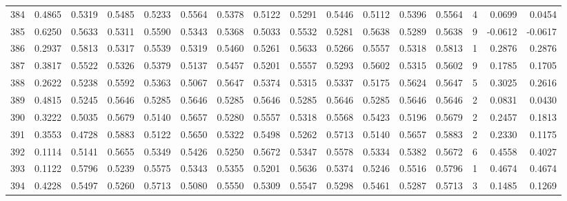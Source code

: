 \begin{tabular}{lrrrrrrrrrrrrrrr}
384 &      0.4865 &  0.5319 &  0.5485 &  0.5233 &  0.5564 &  0.5378 &  0.5122 &  0.5291 &  0.5446 &  0.5112 &   0.5396 &     0.5564 &      4 &                    0.0699 &                     0.0454 \\
385 &      0.6250 &  0.5633 &  0.5311 &  0.5590 &  0.5343 &  0.5368 &  0.5033 &  0.5532 &  0.5281 &  0.5638 &   0.5289 &     0.5638 &      9 &                   -0.0612 &                    -0.0617 \\
386 &      0.2937 &  0.5813 &  0.5317 &  0.5539 &  0.5319 &  0.5460 &  0.5261 &  0.5633 &  0.5266 &  0.5557 &   0.5318 &     0.5813 &      1 &                    0.2876 &                     0.2876 \\
387 &      0.3817 &  0.5522 &  0.5326 &  0.5379 &  0.5137 &  0.5457 &  0.5201 &  0.5557 &  0.5293 &  0.5602 &   0.5315 &     0.5602 &      9 &                    0.1785 &                     0.1705 \\
388 &      0.2622 &  0.5238 &  0.5592 &  0.5363 &  0.5067 &  0.5647 &  0.5374 &  0.5315 &  0.5337 &  0.5175 &   0.5624 &     0.5647 &      5 &                    0.3025 &                     0.2616 \\
389 &      0.4815 &  0.5245 &  0.5646 &  0.5285 &  0.5646 &  0.5285 &  0.5646 &  0.5285 &  0.5646 &  0.5285 &   0.5646 &     0.5646 &      2 &                    0.0831 &                     0.0430 \\
390 &      0.3222 &  0.5035 &  0.5679 &  0.5140 &  0.5657 &  0.5280 &  0.5557 &  0.5318 &  0.5568 &  0.5423 &   0.5196 &     0.5679 &      2 &                    0.2457 &                     0.1813 \\
391 &      0.3553 &  0.4728 &  0.5883 &  0.5122 &  0.5650 &  0.5322 &  0.5498 &  0.5262 &  0.5713 &  0.5140 &   0.5657 &     0.5883 &      2 &                    0.2330 &                     0.1175 \\
392 &      0.1114 &  0.5141 &  0.5655 &  0.5349 &  0.5426 &  0.5250 &  0.5672 &  0.5347 &  0.5578 &  0.5334 &   0.5382 &     0.5672 &      6 &                    0.4558 &                     0.4027 \\
393 &      0.1122 &  0.5796 &  0.5239 &  0.5575 &  0.5343 &  0.5355 &  0.5201 &  0.5636 &  0.5374 &  0.5246 &   0.5516 &     0.5796 &      1 &                    0.4674 &                     0.4674 \\
394 &      0.4228 &  0.5497 &  0.5260 &  0.5713 &  0.5080 &  0.5550 &  0.5309 &  0.5547 &  0.5298 &  0.5461 &   0.5287 &     0.5713 &      3 &                    0.1485 &                     0.1269 \\

\end{tabular}
